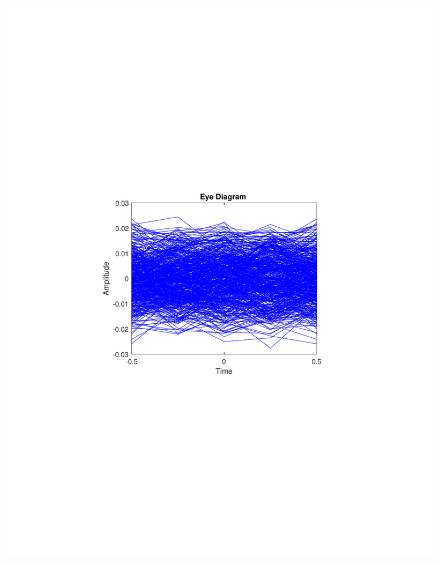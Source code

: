 \begin{refsection}
\begin{figure}[H]
\begin{minipage}{0.30\textwidth}
		\includegraphics[clip, trim=4cm 8cm 4cm 8cm, width=1\textwidth]{./sdf/m_qam_system/figures/expResults/intradyne/0_eye_4GBdInSig13dB_bfFec.pdf}
		\label{fig:4GBdSpecBefFec}
	\end{minipage}
	\begin{minipage}{0.30\textwidth}
		\centering

\end{minipage}
\end{figure}
\end{refsection}
